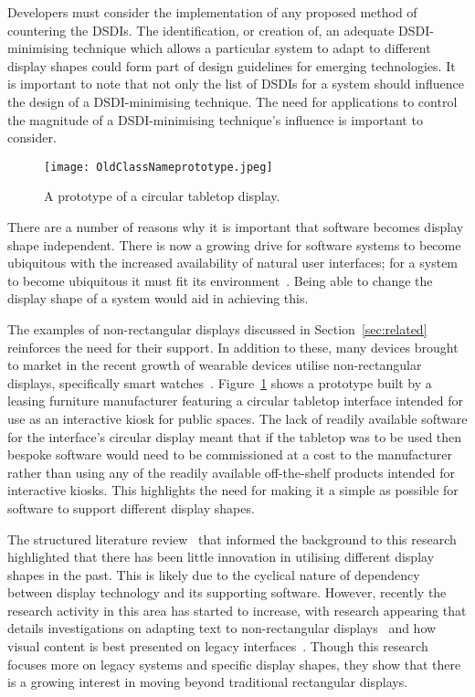 \documentclass[review,5p,times,twocolumn]{elsarticle}
\begin{document}
Developers must consider the implementation of any proposed method of countering the \acp{DSDI}.
The identification, or creation of, an adequate \ac{DSDI}-minimising technique which allows a particular system to adapt to different display shapes could form part of design guidelines for emerging technologies.
It is important to note that not only the list of \acp{DSDI} for a system should influence the design of a \ac{DSDI}-minimising technique.
The need for applications to control the magnitude of a \ac{DSDI}-minimising technique's influence is important to consider.

\begin{figure}[h]
 \centering
   \texttt{[image: OldClassNameprototype.jpeg]}
   \caption{A prototype of a circular tabletop display.}
   \label{fig:prototypeTabletop}
\end{figure}

There are a number of reasons why it is important that software becomes display shape independent.
There is now a growing drive for software systems to become ubiquitous with the increased availability of natural user interfaces; for a system to become ubiquitous it must fit its environment~\cite{Greenfield2006}.
Being able to change the display shape of a system would aid in achieving this.

The examples of non-rectangular displays discussed in Section~\ref{sec:related} reinforces the need for their support.
In addition to these, many devices brought to market in the recent growth of wearable devices utilise non-rectangular displays, specifically smart watches~\cite{Jung2016}.
Figure~\ref{fig:prototypeTabletop} shows a prototype built by a leasing furniture manufacturer featuring a circular tabletop interface intended for use as an interactive kiosk for public spaces.
The lack of readily available software for the interface's circular display meant that if the tabletop was to be used then bespoke software would need to be commissioned at a cost to the manufacturer rather than using any of the readily available off-the-shelf products intended for interactive kiosks.
This highlights the need for making it a simple as possible for software to support different display shapes.

The structured literature review~\cite{Kitchenham2004} that informed the background to this research highlighted that there has been little innovation in utilising different display shapes in the past.
This is likely due to the cyclical nature of dependency between display technology and its supporting software.
However, recently the research activity in this area has started to increase, with research appearing that details investigations on adapting text to non-rectangular displays~\cite{Serrano2016} and how visual content is best presented on legacy interfaces~\cite{Serrano2017}.
Though this research focuses more on legacy systems and specific display shapes, they show that there is a growing interest in moving beyond traditional rectangular displays.
\end{document}

